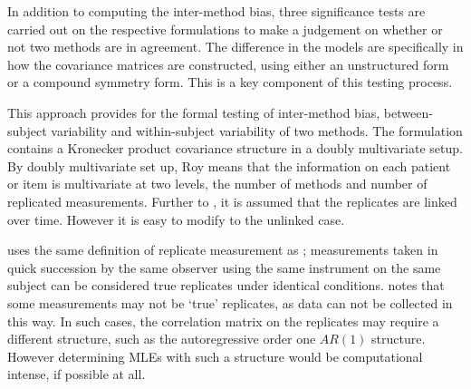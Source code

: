 \documentclass[12pt, a4paper]{report}
\theoremstyle{plain}
\theoremstyle{definition}
\theoremstyle{remark}
\begin{document}
In addition to computing the inter-method bias, three significance tests are carried out on the respective formulations to make a judgement on whether or not two methods are in agreement. The difference in the models are specifically in how the covariance matrices are constructed, using either an unstructured form or a compound symmetry form. This is a key component of this testing process.

This approach provides for the formal testing of inter-method bias, between-subject variability and within-subject variability of two methods. The formulation contains a Kronecker product covariance structure in a doubly multivariate setup. By doubly multivariate set up, Roy means that the information on each patient or item is multivariate at two levels, the number of methods and number of replicated measurements. Further to \citet{lam}, it is assumed that the replicates are linked over time. However it is easy to modify to the unlinked case.

\citet{ARoy2009} uses the same definition of replicate measurement as \citet{BA99}; measurements taken in quick succession by the same observer using the same instrument on the same subject can be considered true replicates under identical conditions.
\citet{ARoy2009} notes that some measurements may not be `true' replicates, as data can not be collected in this way. In such cases, the correlation matrix on the replicates may require a different structure, such as the autoregressive order one $AR(1)$ structure. However determining MLEs with such a structure would be computational intense, if possible at all.
\end{document}
